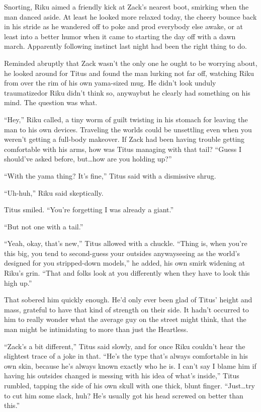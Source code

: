 Snorting, Riku aimed a friendly kick at Zack's nearest boot, smirking when the man danced aside. At least he looked more relaxed today, the cheery bounce back in his stride as he wandered off to poke and prod everybody else awake, or at least into a better humor when it came to starting the day off with a dawn march. Apparently following instinct last night had been the right thing to do.

Reminded abruptly that Zack wasn't the only one he ought to be worrying about, he looked around for Titus and found the man lurking not far off, watching Riku from over the rim of his own yama-sized mug. He didn't look unduly traumatized\textemdash or Riku didn't think so, anyway\textemdash but he clearly had something on his mind. The question was what.

``Hey,'' Riku called, a tiny worm of guilt twisting in his stomach for leaving the man to his own devices. Traveling the worlds could be unsettling even when you weren't getting a full-body makeover. If Zack had been having trouble getting comfortable with his arms, how was Titus managing with that tail? ``Guess I should've asked before, but\ldots how are you holding up?''

``With the yama thing? It's fine,'' Titus said with a dismissive shrug.

``Uh-huh,'' Riku said skeptically.

Titus smiled. ``You're forgetting I was already a giant.''

``But not one with a tail.''

``Yeah, okay, that's new,'' Titus allowed with a chuckle. ``Thing is, when you're this big, you tend to second-guess your outsides anyway\textemdash seeing as the world's designed for you stripped-down models,'' he added, his own smirk widening at Riku's grin. ``That and folks look at you differently when they have to look this high up.''

That sobered him quickly enough. He'd only ever been glad of Titus' height and mass, grateful to have that kind of strength on their side. It hadn't occurred to him to really wonder what the average guy on the street might think, that the man might be intimidating to more than just the Heartless.

``Zack's a bit different,'' Titus said slowly, and for once Riku couldn't hear the slightest trace of a joke in that. ``He's the type that's always comfortable in his own skin, because he's always known exactly who he is. I can't say I blame him if having his outsides changed is messing with his idea of what's inside,'' Titus rumbled, tapping the side of his own skull with one thick, blunt finger. ``Just\ldots try to cut him some slack, huh? He's usually got his head screwed on better than this.''

